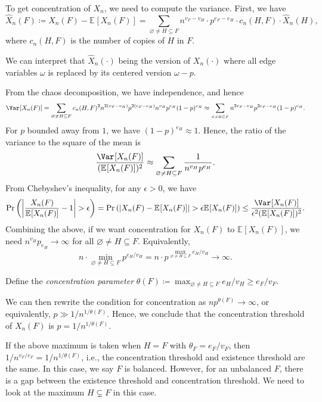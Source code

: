 To get concentration of \(X_n\), we need to compute the variance. First, we have
\[
	\hat{X} _n(F)
	\coloneqq X_n(F) - \mathbb{E}_{}[X_n(F)]
	= \sum_{\varnothing \neq H \subseteq F} n^{v_F - v_H} \cdot p^{e_F - e_H} \cdot c_n(H, F) \cdot \hat{X} _n(H),
\]
where \(c_n(H, F)\) is the number of copies of \(H\) in \(F\).

\begin{note}
	We can interpret that \(\hat{X} _n(\cdot)\) being the version of \(X_n(\cdot)\) where all edge variables \(\omega \) is replaced by its centered version \(\omega - p\).
\end{note}

From the chaos decomposition, we have independence, and hence
\[
	\Var_{}[X_n(F)]
	= \sum_{\varnothing \neq H \subseteq F} c_n(H, F)^2 n^{2 (v_F - v_H)} p^{2(e_F - e_H)} n^{v_H} p^{e_H} (1 - p)^{e_H}
	\approx \sum_{_{\varnothing \neq H \subseteq F}} n^{2 v_F - v_H} p^{2 e_F - e_H} (1 - p)^{e_H}.
\]
For \(p\) bounded away from \(1\), we have \((1 - p)^{e_H} \approx 1\). Hence, the ratio of the variance to the square of the mean is
\[
	\frac{\Var_{}[X_n(F)] }{(\mathbb{E}_{}[X_n(F)] )^2}
	\approx \sum_{\varnothing \neq H \subseteq F} \frac{1}{n^{v_H} p^{e_H}}.
\]
From Chebyshev's inequality, for any \(\epsilon > 0\), we have
\[
	\Pr_{}\left(\left\lvert \frac{X_n(F)}{\mathbb{E}_{}[X_n(F)] } - 1 \right\rvert > \epsilon \right)
	= \Pr_{}\left(\lvert X_n(F) - \mathbb{E}_{}[X_n(F)] \rvert > \epsilon \mathbb{E}_{}[X_n(F)] \right)
	\leq \frac{\Var_{}[X_n(F)] }{\epsilon ^2 (\mathbb{E}_{}[X_n(F)] )^2}.
\]
Combining the above, if we want concentration for \(X_n(F)\) to \(\mathbb{E}_{}[X_n(F)]\), we need \(n^{v_H} p_{e_H} \to \infty\) for all \(\varnothing \neq H \subseteq F\). Equivalently,
\[
	n \cdot \min _{\varnothing \neq H \subseteq F} p^{e_H / v_H}
	= n \cdot p^{\max _{\varnothing \neq H \subseteq F} e_H / v_H}
	\to \infty.
\]

\begin{notation}
	Define the \emph{concentration parameter} \(\theta (F) \coloneqq \max _{\varnothing \neq H \subseteq F} e_H / v_H \geq e_F / v_F\).
\end{notation}

We can then rewrite the condition for concentration as \(n p^{\theta (F)} \to \infty \), or equivalently, \(p \gg 1 / n^{1 / \theta (F)}\). Hence, we conclude that the concentration threshold of \(X_n(F)\) is \(p = 1 / n^{1 / \theta (F)}\).

\begin{remark}
	If the above maximum is taken when \(H = F\) with \(\theta _F = e_F / v_F\), then \(1 / n^{v_F / e_F} = 1 / n^{1 / \theta (F)}\), i.e., the concentration threshold and existence threshold are the same. In this case, we say \(F\) is balanced. However, for an unbalanced \(F\), there is a gap between the existence threshold and concentration threshold. We need to look at the maximum \(H \subsetneq F\) in this case.
\end{remark}


